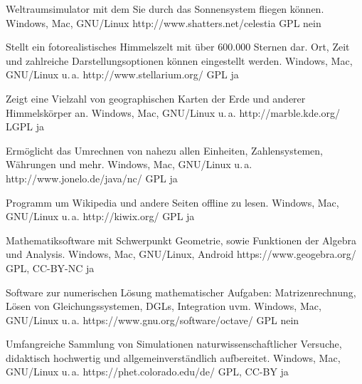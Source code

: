 




{Weltraumsimulator mit dem Sie durch das Sonnensystem fliegen können.}
{Windows, Mac, GNU/Linux}
{http://www.shatters.net/celestia}
{GPL}
{nein}

{Stellt ein fotorealistisches Himmelszelt mit über 600.000 Sternen dar. Ort, Zeit und zahlreiche Darstellungsoptionen können eingestellt werden.}
{Windows, Mac, GNU/Linux u.\,a.}
{http://www.stellarium.org/}
{GPL}
{ja}

{Zeigt eine Vielzahl von geographischen Karten der Erde und anderer Himmelskörper an.}
{Windows, Mac, GNU/Linux u.\,a.}
{http://marble.kde.org/}
{LGPL}
{ja}

{Ermöglicht das Umrechnen von nahezu allen Einheiten, Zahlensystemen, Währungen und mehr.}
{Windows, Mac, GNU/Linux u.\,a.}
{http://www.jonelo.de/java/nc/}
{GPL}
{ja}

{Programm um Wikipedia und andere Seiten offline zu lesen.}
{Windows, Mac, GNU/Linux u.\,a.}
{http://kiwix.org/}
{GPL}
{ja}

{Mathematiksoftware mit Schwerpunkt Geometrie, sowie Funktionen der Algebra und Analysis.}
{Windows, Mac, GNU/Linux, Android}
{https://www.geogebra.org/}
{GPL, CC-BY-NC}
{ja}

{Software zur numerischen Lösung mathematischer Aufgaben: Matrizenrechnung, Lösen von Gleichungssystemen, DGLs, Integration uvm.}
{Windows, Mac, GNU/Linux u.\,a.}
{https://www.gnu.org/software/octave/}
{GPL}
{nein}

{Umfangreiche Sammlung von Simulationen naturwissenschaftlicher Versuche, didaktisch hochwertig und allgemeinverständlich aufbereitet.}
{Windows, Mac, GNU/Linux u.\,a.}
{https://phet.colorado.edu/de/}
{GPL, CC-BY}
{ja}

\backpage


